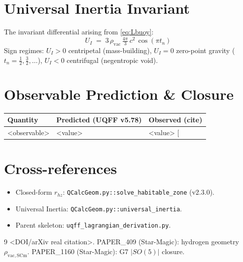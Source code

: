 \documentclass[11pt]{article}
\begin{document}
\section{Universal Inertia Invariant}
The invariant differential arising from \eqref{eq:Lbuoy}:
\begin{equation}
  U_I \;=\; 3\,\rho_{\mathrm{vac}}\,\tfrac{4\pi}{3}\,c^{2}\,\cos(\pi t_n)
\end{equation}
Sign regimes: $U_I>0$ centripetal (mass-building), $U_I=0$ zero-point gravity
($t_n = \tfrac{1}{2}, \tfrac{3}{2}, \ldots$), $U_I<0$ centrifugal (negentropic void).

\section{Observable Prediction \& Closure}
\label{sec:closure}
\begin{longtable}{lll}
\toprule
Quantity & Predicted (UQFF v5.78) & Observed (cite) \\
\midrule
<observable> & <value> & <value> [\cite{<ref>}] \\
\bottomrule
\end{longtable}

\section{Cross-references}
\begin{itemize}
  \item Closed-form $r_{hz}$: \texttt{QCalcGeom.py::solve\_habitable\_zone} (v2.3.0).
  \item Universal Inertia: \texttt{QCalcGeom.py::universal\_inertia}.
  \item Parent skeleton: \texttt{uqff\_lagrangian\_derivation.py}.
\end{itemize}


\begin{thebibliography}{9}
 <DOI/arXiv real citation>.
  PAPER\_409 (Star-Magic): hydrogen geometry $\rho_{\mathrm{vac,SCm}}$.
 PAPER\_1160 (Star-Magic): G7 $|SO(5)|$ closure.
\end{thebibliography}
\end{document}
